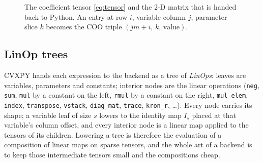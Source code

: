 \documentclass[11pt,a4paper]{article}
\newcommand{\code}[1]{\texttt{#1}}
\begin{document}
\begin{figure}[H]
\centering
{}
\caption{The coefficient tensor \eqref{eq:tensor} and the 2-D matrix that is handed back to Python. An
entry at row $i$, variable column $j$, parameter slice $k$ becomes the COO triple $(jm+i,\,k,\,\text{value})$.}
\label{fig:tensor}
\end{figure}

\subsection{LinOp trees}

CVXPY hands each expression to the backend as a tree of \emph{LinOps}: leaves are variables,
parameters and constants; interior nodes are the linear operations (\code{neg}, \code{sum},
\code{mul} by a constant on the left, \code{rmul} by a constant on the right, \code{mul\_elem},
\code{index}, \code{transpose}, \code{vstack}, \code{diag\_mat}, \code{trace}, \code{kron\_r}, \dots).
Every node carries its shape; a variable leaf of size $s$ lowers to the identity map $I_s$ placed at
that variable's column offset, and every interior node is a linear map applied to the tensors of its
children. Lowering a tree is therefore the evaluation of a composition of linear maps on sparse
tensors, and the whole art of a backend is to keep those intermediate tensors small and the
compositions cheap.
\end{document}
